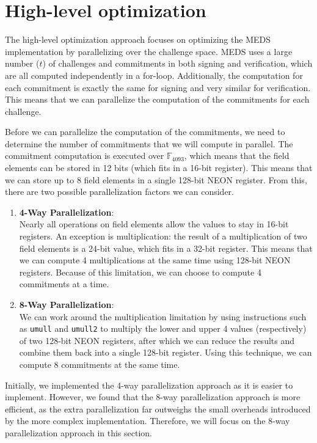 \documentclass[11pt,a4paper]{report}
\theoremstyle{definition}
\begin{document}
\section{High-level optimization}
\label{sec:highleveloptimization}
The high-level optimization approach focuses on optimizing the MEDS implementation by parallelizing over the challenge space. MEDS uses a large number ($t$) of challenges and commitments in both signing and verification, which are all computed independently in a for-loop. Additionally, the computation for each commitment is exactly the same for signing and very similar for verification. This means that we can parallelize the computation of the commitments for each challenge.

Before we can parallelize the computation of the commitments, we need to determine the number of commitments that we will compute in parallel. The commitment computation is executed over $\mathbb{F}_{4093}$, which means that the field elements can be stored in 12 bits (which fits in a 16-bit register). This means that we can store up to 8 field elements in a single 128-bit NEON register. From this, there are two possible parallelization factors we can consider.
\begin{enumerate}
  \item \textbf{4-Way Parallelization}:\\
  Nearly all operations on field elements allow the values to stay in 16-bit registers. An exception is multiplication: the result of a multiplication of two field elements is a 24-bit value, which fits in a 32-bit register. This means that we can compute 4 multiplications at the same time using 128-bit NEON registers. Because of this limitation, we can choose to compute 4 commitments at a time.
  \item \textbf{8-Way Parallelization}:\\
  We can work around the multiplication limitation by using instructions such as \texttt{umull} and \texttt{umull2} to multiply the lower and upper 4 values (respectively) of two 128-bit NEON registers, after which we can reduce the results and combine them back into a single 128-bit register. Using this technique, we can compute 8 commitments at the same time.
\end{enumerate}
Initially, we implemented the 4-way parallelization approach as it is easier to implement. However, we found that the 8-way parallelization approach is more efficient, as the extra parallelization far outweighs the small overheads introduced by the more complex implementation. Therefore, we will focus on the 8-way parallelization approach in this section.
\end{document}
